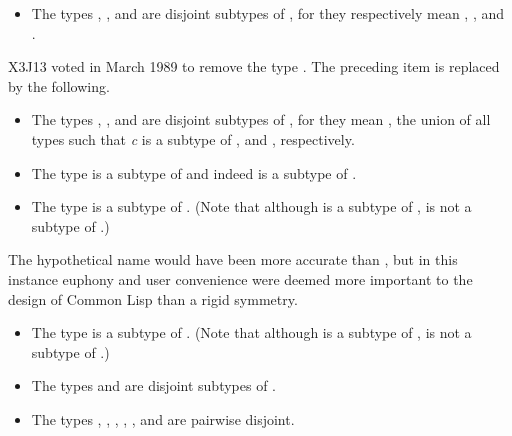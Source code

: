 \begin{obsolete}
\begin{itemize}
\item
The types , , and
 are disjoint subtypes of , for they
respectively mean , ,
and .
\end{itemize}
\end{obsolete}

\begin{newer}
X3J13 voted in March 1989  to remove the type .
The preceding item is replaced by the following.
\begin{itemize}
\item
The types , , and
 are disjoint subtypes of , for they
mean , the union of all types
 such that \emph{c} is a subtype of ,
and , respectively.
\end{itemize}
\end{newer}

\begin{itemize}
\item
The type  is a subtype of  and indeed
is a subtype of .

\item
The type  is a subtype of .
(Note that although  is a subtype of ,
 is not a subtype of .)
\end{itemize}

\beforenoterule
\begin{rationale}
The hypothetical name  would have been more accurate than
, but in this instance euphony and
user convenience were deemed more important to the design
of Common Lisp than a rigid symmetry.
\end{rationale}
\afternoterule

\begin{itemize}
\item
The type  is a subtype of .
(Note that although  is a subtype of ,
 is not a subtype of .)

\item
The types  and  are disjoint subtypes of .

\item
The types , , , ,
, and  are pairwise disjoint.
\end{itemize}

